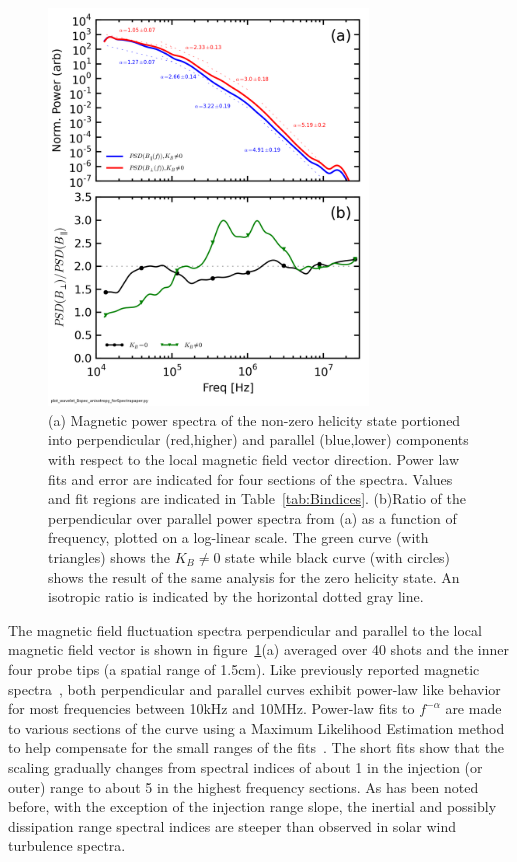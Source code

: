\documentclass[aip,prl,amsmath,amssymb,reprint,superscriptaddress]{revtex4-1} %
\begin{document}
\begin{figure}[!htbp]
\centerline{
\includegraphics[width=8.5cm]{Bperppara_chan1t4_1mWbspectra_40t60us_wAsymRatio}}
\caption{\label{fig:spectra} (a) Magnetic power spectra of the non-zero helicity state portioned into perpendicular (red,higher) and parallel (blue,lower) components with respect to the local magnetic field vector direction. Power law fits and error are indicated for four sections of the spectra. Values and fit regions are indicated in Table~\ref{tab:Bindices}. (b)Ratio of the perpendicular over parallel power spectra from (a) as a function of frequency, plotted on a log-linear scale. The green curve (with triangles) shows the $K_{B}\neq 0$ state while black curve (with circles) shows the result of the same analysis for the zero helicity state. An isotropic ratio is indicated by the horizontal dotted gray line.}
\end{figure}

The magnetic field fluctuation spectra perpendicular and parallel to the local magnetic field vector is shown in figure~\ref{fig:spectra}(a) averaged over 40 shots and the inner four probe tips (a spatial range of 1.5cm). Like previously reported magnetic spectra~\cite{schaffner14a}, both perpendicular and parallel curves exhibit power-law like behavior for most frequencies between 10kHz and 10MHz. Power-law fits to $f^{-\alpha}$ are made to various sections of the curve using a Maximum Likelihood Estimation method~\cite{clauset09} to help compensate for the small ranges of the fits~\cite{deWit13}. The short fits show that the scaling gradually changes from spectral indices of about 1 in the injection (or outer) range to about 5 in the highest frequency sections. As has been noted before, with the exception of the injection range slope, the inertial and possibly dissipation range spectral indices are steeper than observed in solar wind turbulence spectra.
\end{document}
